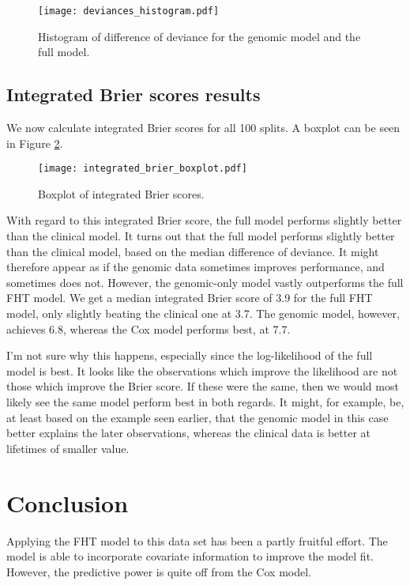 \begin{figure}
\caption{Histogram of difference of deviance for the genomic model and the full model.}
\label{fig:neuroblastoma-deviances-histo}
\centering
\texttt{[image: deviances\_histogram.pdf]}
\end{figure}


\subsection{Integrated Brier scores results}
We now calculate integrated Brier scores for all 100 splits.
A boxplot can be seen in Figure \ref{fig:neuroblastoma-integrated-brier}.
\begin{figure}
\caption{Boxplot of integrated Brier scores.}
\label{fig:neuroblastoma-integrated-brier}
\centering
\texttt{[image: integrated\_brier\_boxplot.pdf]}
\end{figure}
With regard to this integrated Brier score, the full model performs slightly better than the clinical model.
It turns out that the full model performs slightly better than the clinical model, based on the median difference of deviance.
It might therefore appear as if the genomic data sometimes improves performance, and sometimes does not.
However, the genomic-only model vastly outperforms the full FHT model.
We get a median integrated Brier score of 3.9 for the full FHT model, only slightly beating the clinical one at 3.7.
The genomic model, however, achieves 6.8, whereas the Cox model performs best, at 7.7.

I'm not sure why this happens, especially since the log-likelihood of the full model is best.
It looks like the observations which improve the likelihood are not those which improve the Brier score.
If these were the same, then we would most likely see the same model perform best in both regards.
It might, for example, be, at least based on the example seen earlier, that the genomic model in this case better explains the later observations, whereas the clinical data is better at lifetimes of smaller value.

\section{Conclusion}
Applying the FHT model to this data set has been a partly fruitful effort.
The model is able to incorporate covariate information to improve the model fit.
However, the predictive power is quite off from the Cox model.

